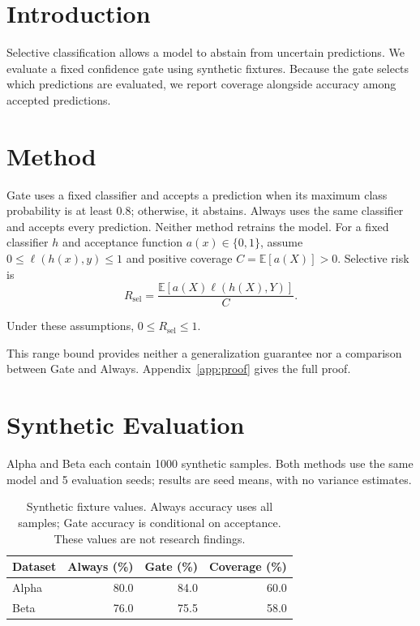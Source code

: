 \section{Introduction}
Selective classification allows a model to abstain from uncertain predictions.
We evaluate a fixed confidence gate using synthetic fixtures. Because the gate
selects which predictions are evaluated, we report coverage alongside accuracy
among accepted predictions.
\section{Method}\label{sec:method}
Gate uses a fixed classifier and accepts a prediction when its maximum class
probability is at least 0.8; otherwise, it abstains. Always uses the same classifier
and accepts every prediction. Neither method retrains the model.
For a fixed classifier $h$ and acceptance function $a(x)\in\{0,1\}$, assume
$0\leq\ell(h(x),y)\leq1$ and positive coverage $C=\mathbb{E}[a(X)]>0$.
Selective risk is
\begin{equation}\label{eq:risk}
R_{\mathrm{sel}}=\frac{\mathbb{E}[a(X)\ell(h(X),Y)]}{C}.
\end{equation}
\begin{PWTheorem}\label{thm:bounded}
Under these assumptions, $0\leq R_{\mathrm{sel}}\leq1$.
\end{PWTheorem}
This range bound provides neither a generalization guarantee nor a comparison
between Gate and Always. Appendix~\ref{app:proof} gives the full proof.
\section{Synthetic Evaluation}\label{sec:results}
Alpha and Beta each contain 1000 synthetic samples. Both methods use the same
model and 5 evaluation seeds; results are seed means, with no variance estimates.

\begin{table}[htbp]\centering
\caption{Synthetic fixture values. Always accuracy uses all samples;
Gate accuracy is conditional on acceptance. These values are not research findings.}
\label{tab:results}
\begin{tabular}{lrrr}\hline
Dataset & Always (\%) & Gate (\%) & Coverage (\%)\\\hline
Alpha & 80.0 & 84.0 & 60.0\\
Beta & 76.0 & 75.5 & 58.0\\\hline
\end{tabular}\end{table}

